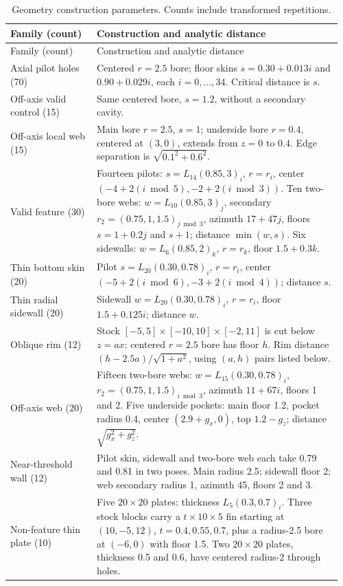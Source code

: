 \begingroup\small
\setlength{\tabcolsep}{4pt}
\begin{longtable}{@{}p{0.25\linewidth}p{0.71\linewidth}@{}}
\caption{Geometry construction parameters. Counts include transformed repetitions.}\label{tab:checker-constructions}\\
\toprule
Family (count) & Construction and analytic distance\\
\midrule
\endfirsthead
\toprule Family (count) & Construction and analytic distance\\\midrule
\endhead
\bottomrule\endfoot
Axial pilot holes (70) & Centered $r=2.5$ bore; floor skins $s=0.30+0.013i$ and $0.90+0.029i$, each $i=0,\ldots,34$. Critical distance is $s$.\\
Off-axis valid control (15) & Same centered bore, $s=1.2$, without a secondary cavity.\\
Off-axis local web (15) & Main bore $r=2.5$, $s=1$; underside bore $r=0.4$, centered at $(3,0)$, extends from $z=0$ to $0.4$. Edge separation is $\sqrt{0.1^2+0.6^2}$.\\
Valid feature (30) & Fourteen pilots: $s=L_{14}(0.85,3)_i$, $r=r_i$, center $(-4+2(i\bmod5),-2+2(i\bmod3))$. Ten two-bore webs: $w=L_{10}(0.85,3)_j$, secondary $r_2=(0.75,1,1.5)_{j\bmod3}$, azimuth $17+47j$, floors $s=1+0.2j$ and $s+1$; distance $\min(w,s)$. Six sidewalls: $w=L_6(0.85,2)_k$, $r=r_k$, floor $1.5+0.3k$.\\
Thin bottom skin (20) & Pilot $s=L_{20}(0.30,0.78)_i$, $r=r_i$, center $(-5+2(i\bmod6),-3+2(i\bmod4))$; distance $s$.\\
Thin radial sidewall (20) & Sidewall $w=L_{20}(0.30,0.78)_i$, $r=r_i$, floor $1.5+0.125i$; distance $w$.\\
Oblique rim (12) & Stock $[-5,5]\times[-10,10]\times[-2,11]$ is cut below $z=ax$; centered $r=2.5$ bore has floor $h$. Rim distance $(h-2.5a)/\sqrt{1+a^2}$, using $(a,h)$ pairs listed below.\\
Off-axis web (20) & Fifteen two-bore webs: $w=L_{15}(0.30,0.78)_i$, $r_2=(0.75,1,1.5)_{i\bmod3}$, azimuth $11+67i$, floors 1 and 2. Five underside pockets: main floor 1.2, pocket radius 0.4, center $(2.9+g_x,0)$, top $1.2-g_z$; distance $\sqrt{g_x^2+g_z^2}$.\\
Near-threshold wall (12) & Pilot skin, sidewall and two-bore web each take 0.79 and 0.81 in two poses. Main radius 2.5; sidewall floor 2; web secondary radius 1, azimuth 45, floors 2 and 3.\\
Non-feature thin plate (10) & Five $20\times20$ plates: thickness $L_5(0.3,0.7)_i$. Three stock blocks carry a $t\times10\times5$ fin starting at $(10,-5,12)$, $t=0.4,0.55,0.7$, plus a radius-2.5 bore at $(-6,0)$ with floor 1.5. Two $20\times20$ plates, thickness 0.5 and 0.6, have centered radius-2 through holes.\\

\end{longtable}
